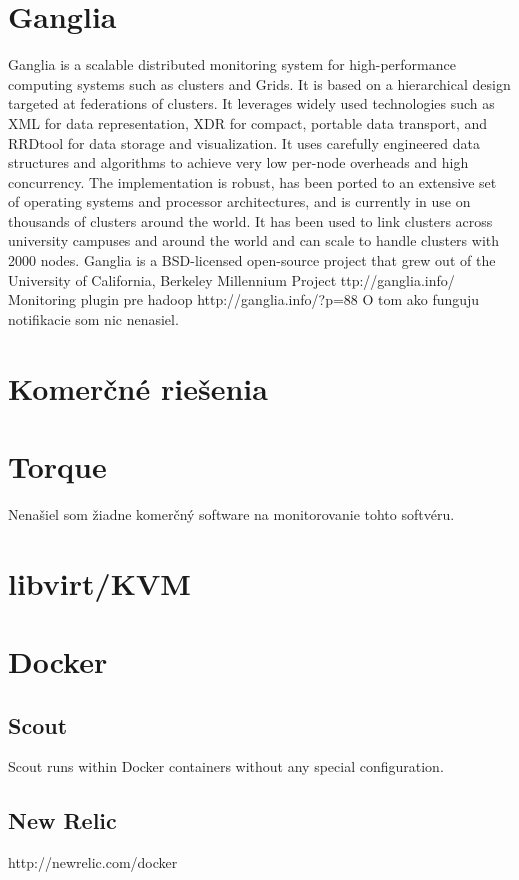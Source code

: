 \documentclass[11pt,final,oneside]{fithesis}
\begin{document}
\section{Ganglia} 
Ganglia is a scalable distributed monitoring system for high-performance computing systems such as clusters and Grids. It is based on a hierarchical design targeted at federations of clusters. It leverages widely used technologies such as XML for data representation, XDR for compact, portable data transport, and RRDtool for data storage and visualization. It uses carefully engineered data structures and algorithms to achieve very low per-node overheads and high concurrency. The implementation is robust, has been ported to an extensive set of operating systems and processor architectures, and is currently in use on thousands of clusters around the world. It has been used to link clusters across university campuses and around the world and can scale to handle clusters with 2000 nodes.
Ganglia is a BSD-licensed open-source project that grew out of the University of California, Berkeley Millennium Project
ttp://ganglia.info/
Monitoring plugin pre hadoop
http://ganglia.info/?p=88
O tom ako funguju notifikacie som nic nenasiel.

\section{Komerčné riešenia}


\section{Torque}
Nenašiel som žiadne komerčný software na monitorovanie tohto softvéru. 

\section{libvirt/KVM}

\section{Docker}
\subsection{Scout}
Scout runs within Docker containers without any special configuration. \cite{scout}

\subsection{New Relic}
http://newrelic.com/docker
\end{document}
